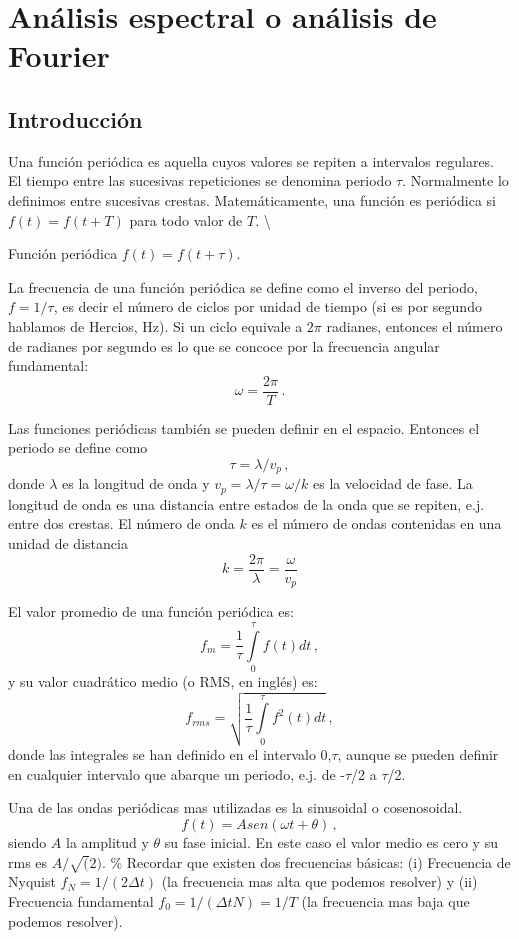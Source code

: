 \documentclass[
]{agujournal2019}
\begin{document}
\section{Análisis espectral o análisis de
Fourier}\label{anuxe1lisis-espectral-o-anuxe1lisis-de-fourier}

\subsection{Introducción}\label{introducciuxf3n}

Una función periódica es aquella cuyos valores se repiten a intervalos
regulares. El tiempo entre las sucesivas repeticiones se denomina
periodo \(\tau\). Normalmente lo definimos entre sucesivas crestas.
Matemáticamente, una función es periódica si \(f(t)=f(t+T)\) para todo
valor de \(T\). \textbackslash{}

\begin{center}
\end{center}
\begin{center}
Función periódica $f(t)=f(t+\tau)$.
\end{center}

La frecuencia de una función periódica se define como el inverso del
periodo, \(f=1/\tau\), es decir el número de ciclos por unidad de tiempo
(si es por segundo hablamos de Hercios, Hz). Si un ciclo equivale a
\(2\pi\) radianes, entonces el número de radianes por segundo es lo que
se concoce por la frecuencia angular fundamental:
\[\omega=\frac{2\pi}{T}\,.\]

Las funciones periódicas también se pueden definir en el espacio.
Entonces el periodo se define como \[\tau=\lambda/v_p\,,\] donde
\(\lambda\) es la longitud de onda y \(v_p=\lambda/\tau=\omega/k\) es la
velocidad de fase. La longitud de onda es una distancia entre estados de
la onda que se repiten, e.j. entre dos crestas. El número de onda \(k\)
es el número de ondas contenidas en una unidad de distancia
\[k=\frac{2\pi}{\lambda}=\frac{\omega}{v_p}\]

El valor promedio de una función periódica es:
\[f_m=\frac{1}{\tau}\int\limits^{\tau}_0 f(t) dt\,,\] y su valor
cuadrático medio (o RMS, en inglés) es:
\[f_{rms}=\sqrt{\frac{1}{\tau}\int\limits^{\tau}_0 f^2(t) dt}\,,\] donde
las integrales se han definido en el intervalo 0,\(\tau\), aunque se
pueden definir en cualquier intervalo que abarque un periodo, e.j. de
-\(\tau\)/2 a \(\tau\)/2.

Una de las ondas periódicas mas utilizadas es la sinusoidal o
cosenosoidal. \[f(t)=A sen(\omega t + \theta)\,,\] siendo \(A\) la
amplitud y \(\theta\) su fase inicial. En este caso el valor medio es
cero y su rms es \(A/\sqrt(2)\). \% Recordar que existen dos frecuencias
básicas: (i) Frecuencia de Nyquist \(f_N=1/(2\Delta t)\) (la frecuencia
mas alta que podemos resolver) y (ii) Frecuencia fundamental
\(f_0=1/(\Delta t N)=1/T\) (la frecuencia mas baja que podemos
resolver).
\end{document}
